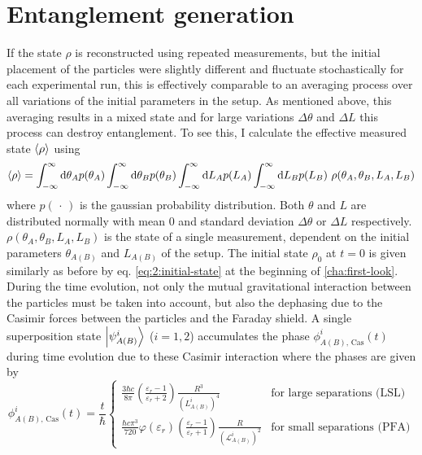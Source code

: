 \section{Entanglement generation}\label{sec:4:entanglement-generation}
If the state $\rho$ is reconstructed using repeated measurements, but the initial placement of the particles were slightly different and fluctuate stochastically for each experimental run, this is effectively comparable to an averaging process over all variations of the initial parameters in the setup.
As mentioned above, this averaging results in a mixed state and for large variations $\Delta \theta$ and $\Delta L$ this process can destroy entanglement.
To see this, I calculate the effective measured state $\left\langle\rho\right\rangle$ using
\begin{equation}\label{eq:4:average-density}
  \left\langle\rho\right\rangle = \int_{-\infty}^{\infty} \dd \theta_A p(\theta_A) \int_{-\infty}^{\infty} \dd \theta_B p(\theta_B) \int_{-\infty}^{\infty} \dd L_A p(L_A) \int_{-\infty}^{\infty} \dd L_B p(L_B) \ \rho(\theta_A, \theta_B, L_A, L_B)
\end{equation} 
where $p(\,\cdot\,)$ is the gaussian probability distribution. Both $\theta$ and $L$ are distributed normally with mean $0$ and standard deviation $\Delta \theta$ or $\Delta L$ respectively. $\rho(\theta_A, \theta_B, L_A, L_B)$ is the state of a single measurement, dependent on the initial parameters $\theta_{A(B)}$ and $L_{A(B)}$ of the setup.
The initial state $\rho_0$ at $t=0$ is given similarly as before by eq. \eqref{eq:2:initial-state} at the beginning of \cref{cha:first-look}.
During the time evolution, not only the mutual gravitational interaction between the particles must be taken into account, but also the dephasing due to the Casimir forces between the particles and the Faraday shield.
A single superposition state $\ket{\psi^i_{A(B)}}$ ($i = 1, 2$) accumulates the phase $\phi^i_{A(B),\,\mathrm{Cas}}(t)$ during time evolution due to these Casimir interaction where the phases are given by
\begin{equation}
  \phi^i_{A(B),\,\mathrm{Cas}}(t) = \frac{t}{\hbar}
  \begin{cases}
     \frac{3 \hbar c}{8 \pi} \left(\frac{\varepsilon_r - 1}{\varepsilon_r + 2}\right) \frac{R^3}{(L^i_{A(B)})^4} & \text{for large separations (LSL)} \\
    \frac{\hbar c \pi^3}{720} \varphi(\varepsilon_r) \left(\frac{\varepsilon_r - 1}{\varepsilon_r + 1}\right) \frac{R}{(\mathscr{L}^i_{A(B)})^2} & \text{for small separations (PFA)}
  \end{cases}
\end{equation}
